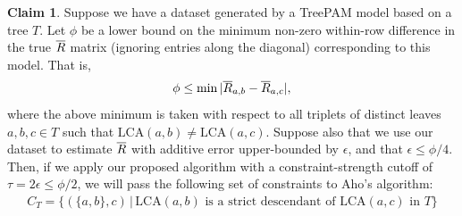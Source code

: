 \documentclass{article}
\theoremstyle{definition}
\newtheorem{claim}[thm]{Claim}
\newcommand{\LCA}{\text{LCA}}
\begin{document}
\begin{claim}
Suppose we have a dataset generated by a TreePAM model based on a tree $T$.
Let $\phi$ be a lower bound on the minimum non-zero within-row difference in the true $\overline{R}$ matrix (ignoring entries along the diagonal) corresponding to this model.
That is,
\begin{align*}
\phi \leq \min |\overline{R}_{a,b} - \overline{R}_{a,c}|,
\end{align*}
where the above minimum is taken with respect to all triplets of distinct leaves $a, b, c \in T$ such that $\LCA(a,b) \neq \LCA(a,c)$.
Suppose also that we use our dataset to estimate $\overline{R}$ with additive error upper-bounded by $\epsilon$, and that $\epsilon \leq \phi/4$.
Then, if we apply our proposed algorithm with a constraint-strength cutoff of $\tau = 2\epsilon \leq \phi/2$, we will pass the following set of constraints to Aho's algorithm:
\begin{align*}
C_T = \{ (\{a,b\},c) \,|\, \LCA(a,b) \text{ is a strict descendant of } \LCA(a,c) \text{ in } T \}
\end{align*}
\end{claim}
\end{document}
